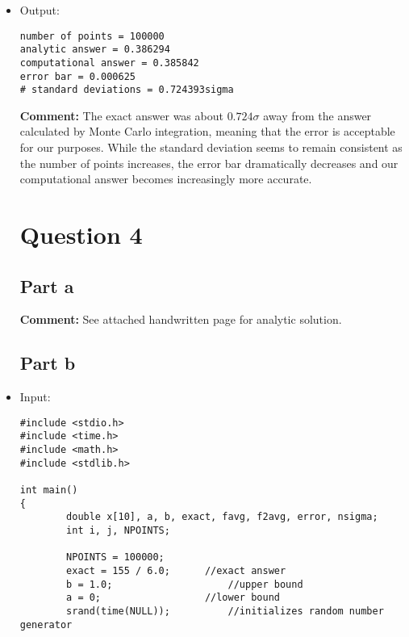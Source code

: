 \documentclass[10pt]{article}
\begin{document}
\begin{itemize}
\begin{verbatim}
        favg /= NPOINTS;
        f2avg /= NPOINTS;
        
        error = sqrt((f2avg - favg*favg)/ (NPOINTS - 1));    //error bar, or standard deviation

        printf("number of points = %d\n", NPOINTS);
        printf("analytic answer = %f\n", exact);
        printf("computational answer = %f\n", (b - a) * favg);
        printf("error bar = %f\n", error);
        printf("# standard deviations = %fsigma\n", fabs((favg - exact) / error));

return 0;
}
\end{verbatim}
\item Output:
\begin{verbatim}
number of points = 100000
analytic answer = 0.386294
computational answer = 0.385842
error bar = 0.000625
# standard deviations = 0.724393sigma
\end{verbatim}
\textbf{Comment:} The exact answer was about $0.724\sigma$ away from the answer calculated by Monte Carlo integration, meaning that the error is acceptable for our purposes. While the standard deviation seems to remain consistent as the number of points increases, the error bar dramatically decreases and our computational answer becomes increasingly more accurate. 

\section*{Question 4}
\subsection*{Part a}
\textbf{Comment:} See attached handwritten page for analytic solution.

\subsection*{Part b}
\item Input:
\begin{verbatim}
#include <stdio.h>
#include <time.h>
#include <math.h>
#include <stdlib.h>

int main()
{
        double x[10], a, b, exact, favg, f2avg, error, nsigma;
        int i, j, NPOINTS;
        
        NPOINTS = 100000;
        exact = 155 / 6.0;      //exact answer
        b = 1.0;					//upper bound
        a = 0;					//lower bound
        srand(time(NULL));			//initializes random number generator 


\end{verbatim}
\end{itemize}
\end{document}
